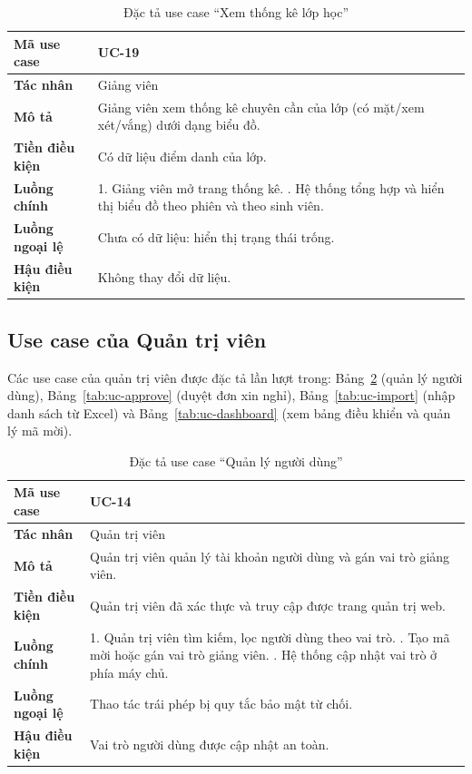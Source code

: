 \begin{table}[H]
\centering
\small
\caption{Đặc tả use case ``Xem thống kê lớp học''}
\label{tab:uc-analytics}
\begin{tabular}{|p{3cm}|p{10.6cm}|}
\hline
\textbf{Mã use case} & UC-19 \\ \hline
\textbf{Tác nhân} & Giảng viên \\ \hline
\textbf{Mô tả} & Giảng viên xem thống kê chuyên cần của lớp (có mặt/xem xét/vắng) dưới dạng biểu đồ. \\ \hline
\textbf{Tiền điều kiện} & Có dữ liệu điểm danh của lớp. \\ \hline
\textbf{Luồng chính} & 1. Giảng viên mở trang thống kê. \newline 2. Hệ thống tổng hợp và hiển thị biểu đồ theo phiên và theo sinh viên. \\ \hline
\textbf{Luồng ngoại lệ} & Chưa có dữ liệu: hiển thị trạng thái trống. \\ \hline
\textbf{Hậu điều kiện} & Không thay đổi dữ liệu. \\ \hline
\end{tabular}
\end{table}

\subsection{Use case của Quản trị viên}

Các use case của quản trị viên được đặc tả lần lượt trong: Bảng~\ref{tab:uc-user} (quản lý
người dùng), Bảng~\ref{tab:uc-approve} (duyệt đơn xin nghỉ), Bảng~\ref{tab:uc-import} (nhập
danh sách từ Excel) và Bảng~\ref{tab:uc-dashboard} (xem bảng điều khiển và quản lý mã mời).

\begin{table}[H]
\centering
\small
\caption{Đặc tả use case ``Quản lý người dùng''}
\label{tab:uc-user}
\begin{tabular}{|p{3cm}|p{10.6cm}|}
\hline
\textbf{Mã use case} & UC-14 \\ \hline
\textbf{Tác nhân} & Quản trị viên \\ \hline
\textbf{Mô tả} & Quản trị viên quản lý tài khoản người dùng và gán vai trò giảng viên. \\ \hline
\textbf{Tiền điều kiện} & Quản trị viên đã xác thực và truy cập được trang quản trị web. \\ \hline
\textbf{Luồng chính} & 1. Quản trị viên tìm kiếm, lọc người dùng theo vai trò. \newline 2. Tạo mã mời hoặc gán vai trò giảng viên. \newline 3. Hệ thống cập nhật vai trò ở phía máy chủ. \\ \hline
\textbf{Luồng ngoại lệ} & Thao tác trái phép bị quy tắc bảo mật từ chối. \\ \hline
\textbf{Hậu điều kiện} & Vai trò người dùng được cập nhật an toàn. \\ \hline
\end{tabular}
\end{table}

